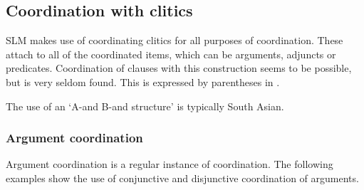 \subsection{Coordination with clitics}\label{sec:constr:CoordinationwithBooleanclitics}
SLM makes use of coordinating clitics  for all purposes of coordination. These attach to all of the coordinated items, which can be arguments, adjuncts or predicates. Coordination    of clauses with this construction  seems to be possible, but is very seldom found. This is expressed by parentheses in .

The use of an `A-and B-and structure' \citep{Haspelmath2004coord} is typically South Asian.



\subsubsection{Argument coordination}\label{sec:constr:Argumentcoordination}
Argument coordination is a regular instance of coordination. The following examples show the use of conjunctive and disjunctive coordination of arguments.



